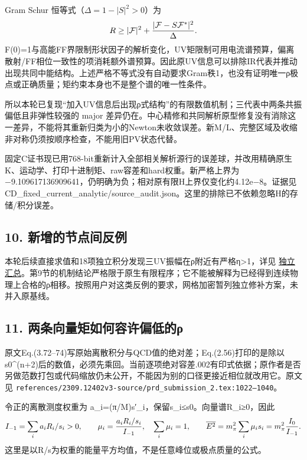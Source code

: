 \documentclass[
  10pt,
  a4paper,
]{article}
\begin{document}
Gram Schur 恒等式（\(\Delta=1-|S|^2>0\)）为 \[
R\ge |\mathcal F|^2+{|\mathcal F-S\mathcal F^*|^2\over\Delta}.
\]
F(0)=1与高能FF界限制形状因子的解析变化，UV矩限制可用电流谱预算，偏离散射/FF相位一致性的项消耗额外谱预算。因此原UV信息可以排除IR代表并推动出现共同中能结构。上述严格不等式没有自动要求Gram秩1，也没有证明唯一ρ极点或正确质量；矩约束本身也不是整个谱的唯一性条件。

所以本轮已复现``加入UV信息后出现ρ式结构''的有限数值机制；三代表中两条共振偏低且非弹性较强的
major
差异仍在。中心精修和共同解析原型修复没有消除这一差异，不能将其重新归类为小的Newton未收敛误差。新M/L、完整区域及收缩非对称仍须按顺序检查，不能用旧PV状态代替。

固定C证书现已用768-bit重新计入全部相关解析源行的误差球，并改用精确原生K、运动学、打印十进制矩、raw容差和hard权重。新严格上界为
−9.109617136909641，仍明确为负；相对原有限H上界仅变化约4.12e−8。证据见
CD\_fixed\_current\_analytic/source\_audit.json。这里的排除已不依赖忽略H的存储/积分误差。

\subsection{10.
新增的节点间反例}\label{ux65b0ux589eux7684ux8282ux70b9ux95f4ux53cdux4f8b}

本轮后续直接求值和18项独立积分发现三UV振幅在ρ附近有严格η\textgreater1，详见
\href{../../../../sequential_reproduction_20260910/HELD_INTER_NODE_ISSUE_ZH.md}{独立汇总}。第9节的机制结论严格限于原生有限程序；它不能被解释为已经得到连续物理上合格的ρ相移。按照用户对这类反例的要求，网格加密暂列独立修补方案，未并入原基线。

\subsection{11.
两条向量矩如何容许偏低的ρ}\label{ux4e24ux6761ux5411ux91cfux77e9ux5982ux4f55ux5bb9ux8bb8ux504fux4f4eux7684ux3c1}

原文Eq.(3.72--74)写原始离散积分与QCD值的绝对差；Eq.(2.56)打印的是除以s0\^{}(n+2)后的数值，必须先乘回。当前逐项绝对容差.002有印式依据；原作者是否另做范数打包或代码缩放仍未公开，不能因为别的口径更接近相位就改用它。原文见
\texttt{references/2309.12402v3-source/prd\_submission\_2.tex:1022–1040}。

令正的离散测度权重为 a\_i=(π/M)s′\_i，保留s\_i≤s0。向量谱R\_i≥0，因此 \[
I_{-1}=\sum_i a_iR_i/s_i>0,\qquad
\mu_i={a_iR_i/s_i\over I_{-1}},\quad\sum_i\mu_i=1,
\qquad \overline{E^2}=m_\pi^2\sum_i\mu_i s_i=m_\pi^2{I_0\over I_{-1}}.
\] 这里是以R/s为权重的能量平方均值，不是任意峰位或极点质量的公式。
\end{document}
